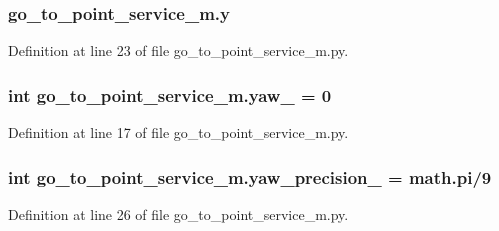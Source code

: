 \subsubsection[{\texorpdfstring{y}{y}}]{\setlength{\rightskip}{0pt plus 5cm}go\+\_\+to\+\_\+point\+\_\+service\+\_\+m.\+y}\hypertarget{namespacego__to__point__service__m_a8a0df04be6cfa44113ee26eefbe11f95}{}\label{namespacego__to__point__service__m_a8a0df04be6cfa44113ee26eefbe11f95}


Definition at line 23 of file go\+\_\+to\+\_\+point\+\_\+service\+\_\+m.\+py.

\subsubsection[{\texorpdfstring{yaw\+\_\+}{yaw_}}]{\setlength{\rightskip}{0pt plus 5cm}int go\+\_\+to\+\_\+point\+\_\+service\+\_\+m.\+yaw\+\_\+ = 0}\hypertarget{namespacego__to__point__service__m_ab1e499009bca0d4c9ea5e8954aa37797}{}\label{namespacego__to__point__service__m_ab1e499009bca0d4c9ea5e8954aa37797}


Definition at line 17 of file go\+\_\+to\+\_\+point\+\_\+service\+\_\+m.\+py.

\subsubsection[{\texorpdfstring{yaw\+\_\+precision\+\_\+}{yaw_precision_}}]{\setlength{\rightskip}{0pt plus 5cm}int go\+\_\+to\+\_\+point\+\_\+service\+\_\+m.\+yaw\+\_\+precision\+\_\+ = math.\+pi/9}\hypertarget{namespacego__to__point__service__m_af47f1354626111fc63115c06276ae41d}{}\label{namespacego__to__point__service__m_af47f1354626111fc63115c06276ae41d}


Definition at line 26 of file go\+\_\+to\+\_\+point\+\_\+service\+\_\+m.\+py.


